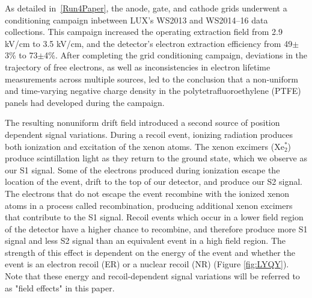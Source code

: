 \documentclass[a4paper,10pt,twocolumn]{article}
\begin{document}
As detailed in~\ref{Run4Paper}, the anode, gate, and cathode grids underwent a conditioning campaign inbetween LUX's WS2013 and WS2014–16 data collections.  This campaign increased the operating extraction field from 2.9 kV/cm to 3.5 kV/cm, and the detector's electron extraction efficiency from 49$\pm$3\% to 73$\pm$4\%.  After completing the grid conditioning campaign, deviations in the trajectory of free electrons, as well as inconsistencies in electron lifetime measurements across multiple sources, led to the conclusion that a non-uniform and time-varying negative
charge density in the polytetrafluoroethylene (PTFE)
panels had developed during the campaign.

The resulting nonuniform drift field introduced a second source of position dependent signal variations.  During a recoil event, ionizing radiation produces both ionization and excitation of the xenon atoms.  The xenon excimers (Xe$_2^*$) produce scintillation light as they return to the ground state, which we observe as our S1 signal. Some of the electrons produced during ionization escape the location of the event, drift to the top of our detector, and produce our S2 signal.  The electrons that do not escape the event recombine with the ionized xenon atoms in a process called recombination, producing additional xenon excimers that contribute to the S1 signal.  Recoil events which occur in a lower field region of the detector have a higher chance to recombine, and therefore produce more S1 signal and less S2 signal than an equivalent event in a high field region.  The strength of this effect is dependent on the energy of the event and whether the event is an electron recoil (ER) or a nuclear recoil (NR) (Figure \ref{fig:LYQY}).  Note that these energy and recoil-dependent signal variations will be referred to as "field effects" in this paper.  
\end{document}
